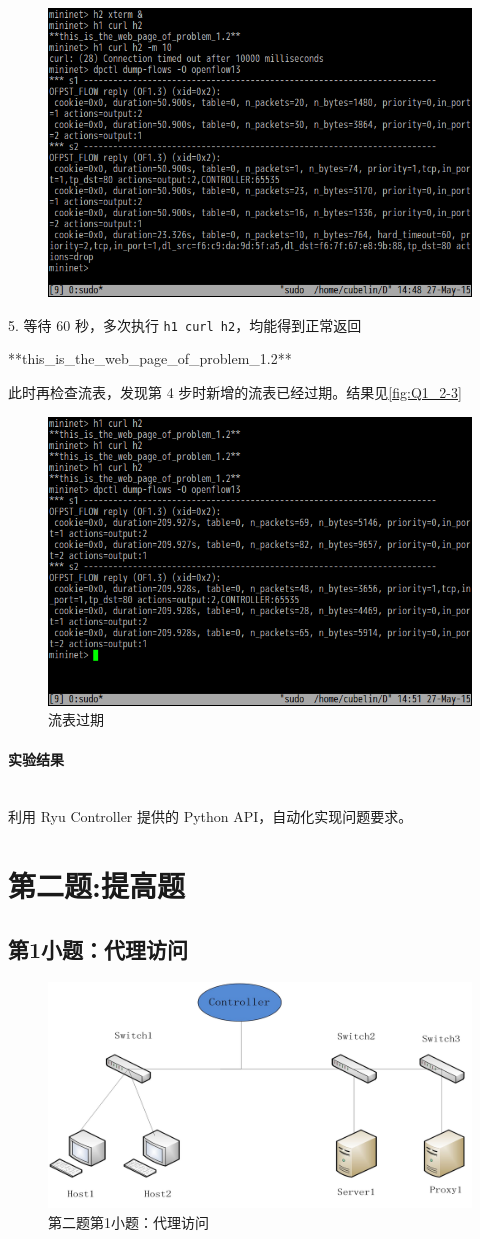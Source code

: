 \documentclass[format=draft,language=chinese,category=SDN]{hustreport}
\newcommand{\myparagraph}[1]{\paragraph{#1}\mbox{}\\}
\newcommand{\code}{\texttt}
\begin{document}
\begin{figure}[!h]
\centering
\includegraphics[width=.618\textwidth]{fig/1_2-2.png}
\caption{}\label{fig:Q1_2-2}
\end{figure}

5. 等待 60 秒，多次执行 \code{h1 curl h2}，均能得到正常返回
\begin{center}
**this\_is\_the\_web\_page\_of\_problem\_1.2**
\end{center}
此时再检查流表，发现第 4 步时新增的流表已经过期。结果见\autoref{fig:Q1_2-3}

\begin{figure}[!h]
\centering
\includegraphics[width=.618\textwidth]{fig/1_2-3.png}
\caption{流表过期}\label{fig:Q1_2-3}
\end{figure}

\myparagraph{实验结果}

利用 Ryu Controller 提供的 Python API，自动化实现问题要求。

\section{第二题:提高题}\label{sec:Q2}
\subsection{第1小题：代理访问}\label{sec:Q2_1}

\begin{figure}[!h]
\centering
\includegraphics[width=.618\textwidth]{fig/2_1-0.png}
\caption{第二题第1小题：代理访问}\label{fig:Q2_1-0}
\end{figure}
\end{document}
